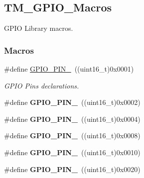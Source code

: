 \hypertarget{group___t_m___g_p_i_o___macros}{}\subsection{T\+M\+\_\+\+G\+P\+I\+O\+\_\+\+Macros}
\label{group___t_m___g_p_i_o___macros}


G\+P\+I\+O Library macros.  


\subsubsection*{Macros}
\begin{DoxyCompactItemize}
\item 
\#define \hyperlink{group___t_m___g_p_i_o___macros_ga176efbf43a259b7bb0a85a47401505be}{G\+P\+I\+O\+\_\+\+P\+I\+N\+\_}~((uint16\+\_\+t)0x0001)
\begin{DoxyCompactList}\small\item\em G\+P\+I\+O Pins declarations. \end{DoxyCompactList}\item 
\hypertarget{group___t_m___g_p_i_o___macros_ga6c35af4e75c3cb57bb650feaa7a136b5}{}\#define {\bfseries G\+P\+I\+O\+\_\+\+P\+I\+N\+\_}~((uint16\+\_\+t)0x0002)\label{group___t_m___g_p_i_o___macros_ga6c35af4e75c3cb57bb650feaa7a136b5}

\item 
\hypertarget{group___t_m___g_p_i_o___macros_ga6eee38b797a7268f04357dfa2759efd2}{}\#define {\bfseries G\+P\+I\+O\+\_\+\+P\+I\+N\+\_}~((uint16\+\_\+t)0x0004)\label{group___t_m___g_p_i_o___macros_ga6eee38b797a7268f04357dfa2759efd2}

\item 
\hypertarget{group___t_m___g_p_i_o___macros_gadcaf899c018a0dde572b5af783565c62}{}\#define {\bfseries G\+P\+I\+O\+\_\+\+P\+I\+N\+\_}~((uint16\+\_\+t)0x0008)\label{group___t_m___g_p_i_o___macros_gadcaf899c018a0dde572b5af783565c62}

\item 
\hypertarget{group___t_m___g_p_i_o___macros_gab3871e35868deecd260e586ad70d4b83}{}\#define {\bfseries G\+P\+I\+O\+\_\+\+P\+I\+N\+\_}~((uint16\+\_\+t)0x0010)\label{group___t_m___g_p_i_o___macros_gab3871e35868deecd260e586ad70d4b83}

\item 
\hypertarget{group___t_m___g_p_i_o___macros_ga01cc9ed93f6fd12fd3403362779aaa18}{}\#define {\bfseries G\+P\+I\+O\+\_\+\+P\+I\+N\+\_}~((uint16\+\_\+t)0x0020)\label{group___t_m___g_p_i_o___macros_ga01cc9ed93f6fd12fd3403362779aaa18}


\end{DoxyCompactItemize}
